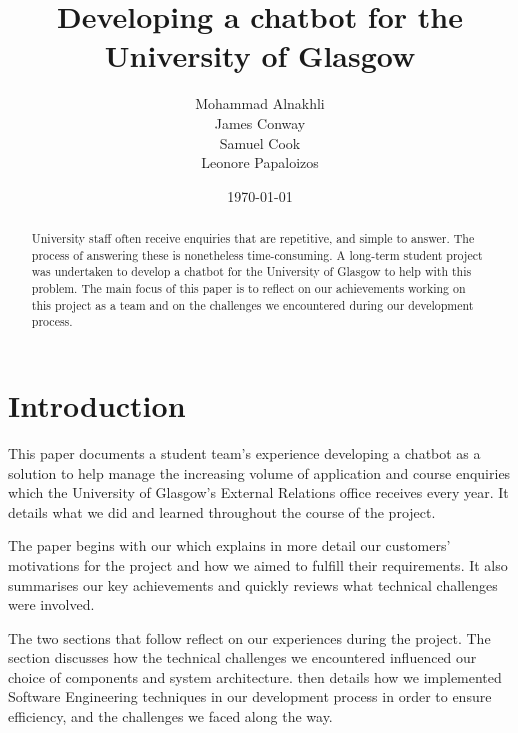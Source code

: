 \documentclass{l3proj}
\begin{document}
\title{Developing a chatbot for the University of Glasgow}

\author{Mohammad Alnakhli \\
        James Conway \\
        Samuel Cook \\
        Leonore Papaloizos}

\date{\today}

\maketitle

\begin{abstract}
University staff often receive enquiries that are repetitive, and simple to answer. The process of answering these is nonetheless time-consuming. A long-term student project was undertaken to develop a chatbot for the University of Glasgow to help with this problem. The main focus of this paper is to reflect on our achievements working on this project as a team and on the challenges we encountered during our development process.

\end{abstract}

\educationalconsent

\newpage

\section{Introduction}

This paper documents a student team's experience developing a chatbot as a solution to help manage the increasing volume of application and course enquiries which the University of Glasgow's External Relations office receives every year. It details what we did and learned throughout the course of the project.

The paper begins with our  which explains in more detail our customers' motivations for the project and how we aimed to fulfill their requirements. It also summarises our key achievements and quickly reviews what technical challenges were involved.

The two sections that follow reflect on our experiences during the project. The  section discusses how the technical challenges we encountered influenced our choice of components and system architecture.  then details how we implemented Software Engineering techniques in our development process in order to ensure efficiency, and the challenges we faced along the way.
\end{document}
